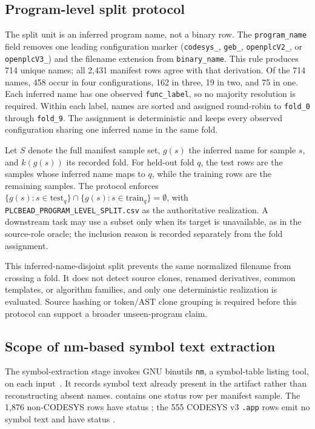 \documentclass[manuscript,screen,review]{acmart}
\begin{document}
\subsection{Program-level split protocol}

The split unit is an inferred program name, not a binary row. The \texttt{program\_name} field removes one leading configuration marker (\texttt{codesys\_}, \texttt{geb\_}, \texttt{openplcV2\_}, or \texttt{openplcV3\_}) and the filename extension from \texttt{binary\_name}. This rule produces 714 unique names; all 2{,}431 manifest rows agree with that derivation. Of the 714 names, 458 occur in four configurations, 162 in three, 19 in two, and 75 in one. Each inferred name has one observed \texttt{func\_label}, so no majority resolution is required. Within each label, names are sorted and assigned round-robin to \texttt{fold\_0} through \texttt{fold\_9}. The assignment is deterministic and keeps every observed configuration sharing one inferred name in the same fold.

Let $S$ denote the full manifest sample set, $g(s)$ the inferred name for sample $s$, and $k(g(s))$ its recorded fold. For held-out fold $q$, the test rows are the samples whose inferred name maps to $q$, while the training rows are the remaining samples. The protocol enforces $\{g(s): s \in \mathrm{test}_q\} \cap \{g(s): s \in \mathrm{train}_q\} = \emptyset$, with \texttt{PLCBEAD\_PROGRAM\_LEVEL\_SPLIT.csv} as the authoritative realization. A downstream task may use a subset only when its target is unavailable, as in the source-role oracle; the inclusion reason is recorded separately from the fold assignment.

This inferred-name-disjoint split prevents the same normalized filename from crossing a fold. It does not detect source clones, renamed derivatives, common templates, or algorithm families, and only one deterministic realization is evaluated. Source hashing or token/AST clone grouping is required before this protocol can support a broader unseen-program claim.

\subsection{Scope of nm-based symbol text extraction}

The symbol-extraction stage invokes GNU binutils \texttt{nm}, a symbol-table listing tool, on each input~\cite{gnu_binutils_nm}. It records symbol text already present in the artifact rather than reconstructing absent names.  contains one status row per manifest sample. The 1{,}876 non-CODESYS rows have status ; the 555 CODESYS v3 \texttt{.app} rows emit no symbol text and have status .
\end{document}
